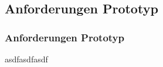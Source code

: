 \subsection{Anforderungen Prototyp}

\begin{frame}
\frametitle{Anforderungen Prototyp}

asdfasdfasdf

\end{frame}